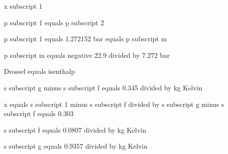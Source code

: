 x subscript 1  

p subscript 1 equals p subscript 2  

p subscript 1 equals 1.272152 bar equals p subscript m  

p subscript m equals negative 22.9 divided by 7.272 bar  

Drossel equals isenthalp  

s subscript g minus s subscript f equals 0.345 divided by kg Kelvin  

x equals s subscript 1 minus s subscript f divided by s subscript g minus s subscript f equals 0.303  

s subscript f equals 0.0807 divided by kg Kelvin  

s subscript g equals 0.9357 divided by kg Kelvin